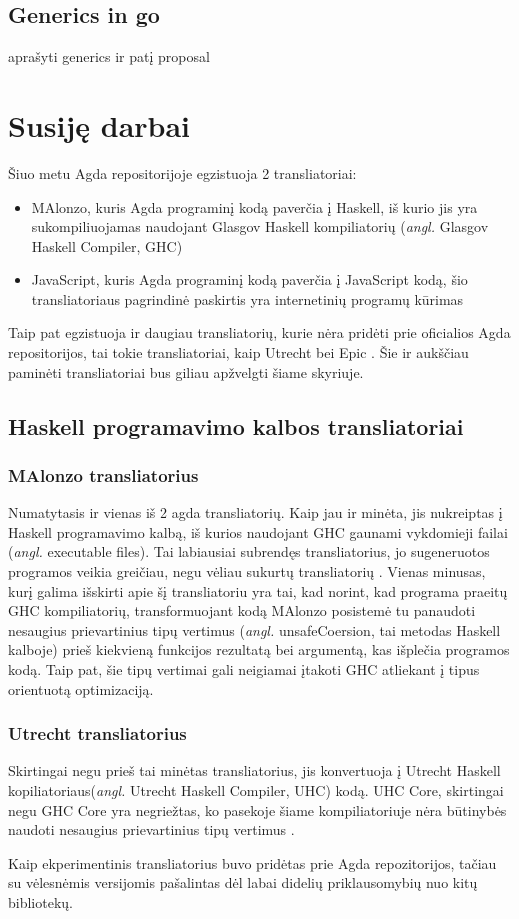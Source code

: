 \documentclass{VUMIFPSkursinis}
\begin{document}
\subsection{Generics in go}
aprašyti generics ir patį proposal
\section{Susiję darbai}
Šiuo metu Agda repositorijoje egzistuoja 2 transliatoriai: 
\begin{itemize}
	\item MAlonzo, kuris Agda programinį kodą paverčia į Haskell, iš kurio jis yra sukompiliuojamas naudojant Glasgov Haskell kompiliatorių (\textit{angl.} Glasgov Haskell Compiler, GHC)
	\item JavaScript, kuris Agda programinį kodą paverčia į JavaScript kodą, šio transliatoriaus pagrindinė paskirtis yra internetinių programų kūrimas \cite{html_agda}
\end{itemize}
Taip pat egzistuoja ir daugiau transliatorių, kurie nėra pridėti prie oficialios Agda repositorijos, tai tokie transliatoriai, kaip Utrecht bei Epic \cite{Utrecht,Epic}. Šie ir aukščiau paminėti transliatoriai bus giliau apžvelgti šiame skyriuje.
\subsection{Haskell programavimo kalbos transliatoriai}
\subsubsection{MAlonzo transliatorius}
Numatytasis ir vienas iš 2 agda transliatorių. Kaip jau ir minėta, jis nukreiptas į Haskell programavimo kalbą, iš kurios naudojant GHC gaunami vykdomieji failai (\textit{angl.} executable files). Tai labiausiai subrendęs transliatorius, jo sugeneruotos programos veikia greičiau, negu vėliau sukurtų transliatorių \cite{Utrecht,Epic}. Vienas minusas, kurį galima išskirti apie šį transliatoriu yra tai, kad norint, kad programa praeitų GHC kompiliatorių, transformuojant kodą MAlonzo posistemė tu panaudoti nesaugius prievartinius tipų vertimus (\textit{angl.} unsafeCoersion, tai metodas Haskell kalboje) prieš kiekvieną funkcijos rezultatą bei argumentą, kas išplečia programos kodą. Taip pat, šie tipų vertimai gali neigiamai įtakoti GHC atliekant į tipus orientuotą optimizaciją.
\subsubsection{Utrecht transliatorius}
Skirtingai negu prieš tai minėtas transliatorius, jis konvertuoja į Utrecht Haskell kopiliatoriaus(\textit{angl.} Utrecht Haskell Compiler, UHC) kodą. UHC Core, skirtingai negu GHC Core yra negriežtas, ko pasekoje šiame kompiliatoriuje nėra būtinybės naudoti nesaugius prievartinius tipų vertimus \cite{Utrecht}.\par Kaip ekperimentinis transliatorius buvo pridėtas prie Agda repozitorijos, tačiau su vėlesnėmis versijomis pašalintas dėl labai didelių priklausomybių nuo kitų bibliotekų.
\end{document}
